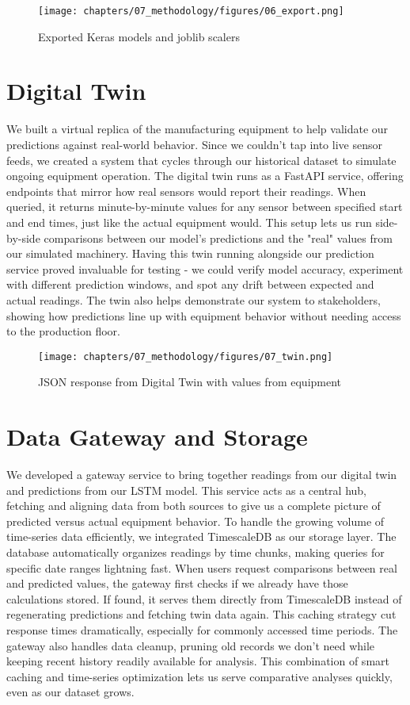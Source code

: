 \begin{figure}[H]
    \centering
    \texttt{[image: chapters/07\_methodology/figures/06\_export.png]}
    \caption{Exported Keras models and joblib scalers}
\end{figure}

\section{Digital Twin}
We built a virtual replica of the manufacturing equipment to help validate our predictions against real-world behavior. Since we couldn't tap into live sensor feeds, we created a system that cycles through our historical dataset to simulate ongoing equipment operation. The digital twin runs as a FastAPI service, offering endpoints that mirror how real sensors would report their readings. When queried, it returns minute-by-minute values for any sensor between specified start and end times, just like the actual equipment would. This setup lets us run side-by-side comparisons between our model's predictions and the "real" values from our simulated machinery. Having this twin running alongside our prediction service proved invaluable for testing - we could verify model accuracy, experiment with different prediction windows, and spot any drift between expected and actual readings. The twin also helps demonstrate our system to stakeholders, showing how predictions line up with equipment behavior without needing access to the production floor.

\begin{figure}[H]
    \centering
    \texttt{[image: chapters/07\_methodology/figures/07\_twin.png]}
    \caption{JSON response from Digital Twin with values from equipment}
\end{figure}

\section{Data Gateway and Storage}
We developed a gateway service to bring together readings from our digital twin and predictions from our LSTM model. This service acts as a central hub, fetching and aligning data from both sources to give us a complete picture of predicted versus actual equipment behavior. To handle the growing volume of time-series data efficiently, we integrated TimescaleDB as our storage layer. The database automatically organizes readings by time chunks, making queries for specific date ranges lightning fast. When users request comparisons between real and predicted values, the gateway first checks if we already have those calculations stored. If found, it serves them directly from TimescaleDB instead of regenerating predictions and fetching twin data again. This caching strategy cut response times dramatically, especially for commonly accessed time periods. The gateway also handles data cleanup, pruning old records we don't need while keeping recent history readily available for analysis. This combination of smart caching and time-series optimization lets us serve comparative analyses quickly, even as our dataset grows.

